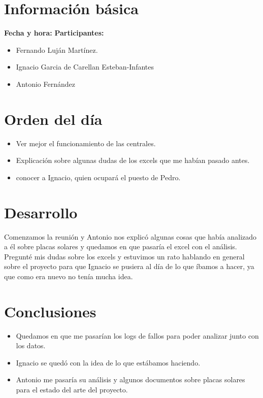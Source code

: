 \documentclass[a4paper]{article}
\begin{document}
\section{Información básica}
\textbf{Fecha y hora: }
\newline
\textbf{Participantes:}
\begin{itemize}
	\item Fernando Luján Martínez.
    \item Ignacio Garcia de Carellan Esteban-Infantes
    \item Antonio Fernández
\end{itemize}
\section{Orden del día}
\begin{itemize}
\item Ver mejor el funcionamiento de las centrales.
\item Explicación sobre algunas dudas de los excels que me habían pasado antes.
\item conocer a Ignacio, quien ocupará el puesto de Pedro.
\end{itemize}
\section{Desarrollo}
Comenzamos la reunión y Antonio nos explicó algunas cosas que había analizado a él sobre placas solares y quedamos en que pasaría el excel con el análisis. Pregunté mis dudas sobre los excels y estuvimos un rato hablando en general sobre el proyecto para que Ignacio se pusiera al día de lo que íbamos a hacer, ya que como era nuevo no tenía mucha idea.
\section{Conclusiones}
\begin{itemize}
\item Quedamos en que me pasarían los logs de fallos para poder analizar junto con los datos.
\item Ignacio se quedó con la idea de lo que estábamos haciendo.
\item Antonio me pasaría su análisis y algunos documentos sobre placas solares para el estado del arte del proyecto.
\end{itemize}
\end{document}
